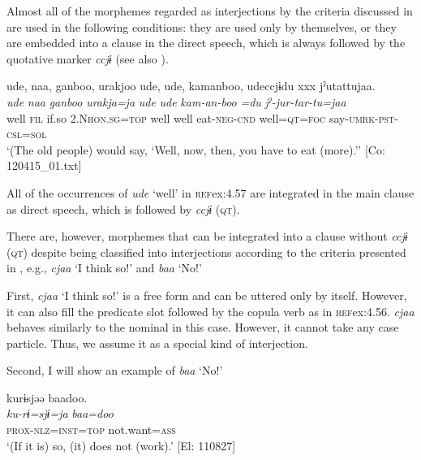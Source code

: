   Almost all of the morphemes regarded as interjections by the criteria discussed in  are used in the following conditions: they are used only by themselves, or they are embedded into a clause in the direct speech, which is always followed by the quotative marker \textit{ccjɨ} (see also ).

\ea{} \label{ex:4.57}
\glll   ude,  naa,  ganboo,  urakjoo  ude,  ude,  kamanboo,   udeccjɨdu  xxx  jˀutattujaa.\\
    \textit{ude}  \textit{naa}  \textit{ganboo}  \textit{urakja=ja}  \textit{ude}  \textit{ude}  \textit{kam-an-boo}   \textit{=du}    \textit{jˀ-jur-tar-tu=jaa}\\
    well  \textsc{fil}  if.so  2.N\textsc{hon}.\textsc{sg}=\textsc{top}  well  well  eat-\textsc{neg}-\textsc{cnd}                                                            well=\textsc{qt}=\textsc{foc}    say-\textsc{umrk}-\textsc{pst}-\textsc{csl}=\textsc{sol}\\
  \glt     ‘(The old people) would say, ‘Well, now, then, you have to eat (more).’’ [Co: 120415\_01.txt]
  \z

All of the occurrences of \textit{ude} ‘well’ in \textsc{ref}{ex:4.57} are integrated in the main clause as direct speech, which is followed by \textit{ccjɨ} (\textsc{qt}).

There are, however, morphemes that can be integrated into a clause without \textit{ccjɨ} (\textsc{qt}) despite being classified into interjections according to the criteria presented in , e.g., \textit{cjaa} ‘I think so!’ and \textit{baa} ‘No!’

First, \textit{cjaa} ‘I think so!’ is a free form and can be uttered only by itself. However, it can also fill the predicate slot followed by the copula verb as in \textsc{ref}{ex:4.56}. \textit{cjaa} behaves similarly to the nominal in this case. However, it cannot take any case particle. Thus, we assume it as a special kind of interjection.

Second, I will show an example of \textit{baa} ‘No!’

\ea \label{ex:4.58}
\glll    kurɨsjəə  baadoo.\\
    \textit{ku-rɨ=sjɨ=ja}  \textit{baa=doo}\\
    \textsc{prox}-\textsc{nlz}=\textsc{inst}=\textsc{top}  not.want=\textsc{ass}\\
  \glt     ‘(If it is) so, (it) does not (work).’ [El: 110827]
\z

